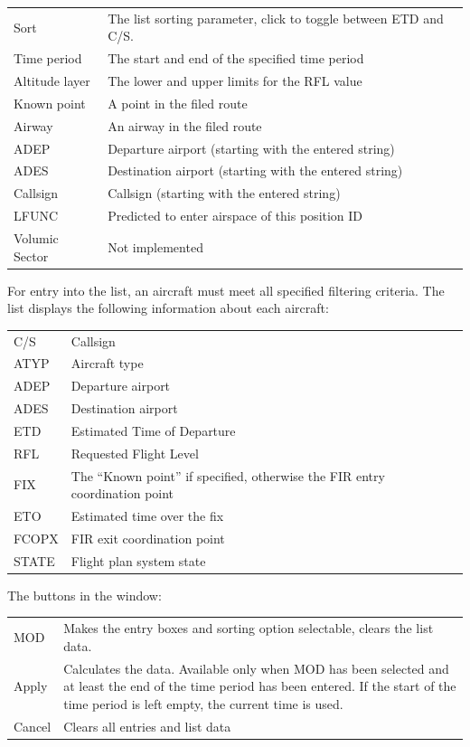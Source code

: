 \documentclass[a4paper,oneside,11pt]{memoir}
\begin{document}
\begin{longtable}{p{2.5cm} p{10cm}}
  Sort            & The list sorting parameter, click to toggle between ETD and C/S.\\
  Time period     & The start and end of the specified time period\\
  Altitude layer  & The lower and upper limits for the RFL value\\
  Known point     & A point in the filed route\\
  Airway          & An airway in the filed route\\
  ADEP            & Departure airport (starting with the entered string)\\
  ADES            & Destination airport (starting with the entered string)\\
  Callsign        & Callsign (starting with the entered string)\\
  LFUNC           & Predicted to enter airspace of this position ID\\
  Volumic Sector  & Not implemented\\
\end{longtable}

For entry into the list, an aircraft must meet all specified filtering criteria. The list displays the following information about each aircraft:

\begin{longtable}{p{2.5cm} p{10cm}}
  C/S   & Callsign\\
  ATYP  & Aircraft type\\
  ADEP  & Departure airport\\
  ADES  & Destination airport\\
  ETD   & Estimated Time of Departure\\
  RFL   & Requested Flight Level\\
  FIX   & The “Known point” if specified, otherwise the FIR entry coordination point\\
  ETO   & Estimated time over the fix\\
  FCOPX & FIR exit coordination point\\
  STATE & Flight plan system state\\
\end{longtable}

The buttons in the window:

\begin{longtable}{p{2.5cm} p{10cm}}
  MOD     & Makes the entry boxes and sorting option selectable, clears the list data.\\
  Apply   & Calculates the data. Available only when MOD has been selected and at least the end of the time period has been entered. If the start of the time period is left empty, the current time is used.\\
  Cancel  & Clears all entries and list data\\
\end{longtable}
\end{document}
